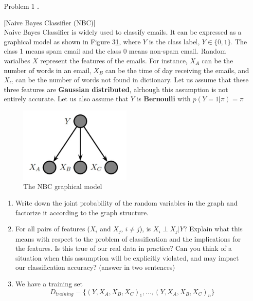 \documentclass{article}
\newcounter{pcounter}                                   %
\newenvironment{problem}                                %
{                                                       %
    \color{gray}                                        %
    \stepcounter{pcounter}                              %
    \textbf{\arabic{pcounter}.}                         %
}{}                                                     %
\begin{document}
\begin{section}{Problem 1}
        \begin{problem}
            [Naive Bayes Classifier (NBC)]\\
            Naive Bayes Classifier is widely used to classify emails. It can be expressed as a graphical model as shown in Figure 3\ref{fig:m3}, where $Y$ is the class label, $Y \in \{0, 1\}$. The class 1 means spam email and the class 0 means non-spam email.
            Random varialbes $X$ represent the features of the emails. For instance, $X_A$ can be the number of words in an email, $X_B$ can be the time of day receiving the emails, and $X_C$ can be the number of words not found in dictionary.
            Let us assume that these three features are \textbf{Gaussian distributed}, alrhough this assumption is not entirely accurate. Let us also assume that $Y$ is \textbf{Bernoulli} with $p(Y=1 | \pi) = \pi$
            \begin{figure}[H]
                \label{fig:m3}
                \centering
                \includegraphics[width=0.5\textwidth]{a2_p12}
                \caption{The NBC graphical model}
            \end{figure}
            \begin{enumerate}[label=(\alph*)]
                \item Write down the joint probability of the random variables in the graph and factorize it according to the graph structure.
                \item For all pairs of features ($X_i$ and $X_j$, $i \neq j$),
                is $X_i \perp X_j | Y$? Explain what this means with respect to the problem of classification and the implications for the features.
                Is this true of our real data in practice?
                Can you think of a situation when this assumption will be explicitly violated, and may impact our classification accuracy? (answer in two sentences)
                \item We have a training set
                      $$
                      D_{training} = \{ (Y, X_A, X_B, X_C)_1, \dots, (Y, X_A, X_B, X_C)_n \}
$$
\end{enumerate}
\end{problem}
\end{section}
\end{document}
